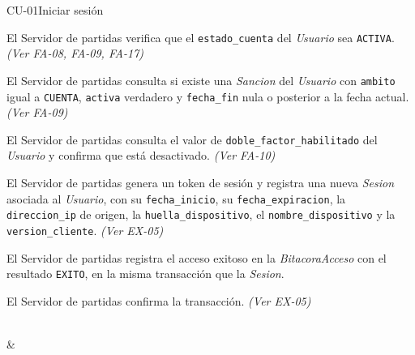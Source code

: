 \begin{fichacu}{CU-01}{Iniciar sesión}
{\begin{cuenum}[start=9]
      \item El Servidor de partidas verifica que el \texttt{estado\_\allowbreak{}cuenta} del \textit{Usuario} sea \texttt{ACTIVA}. \textit{(Ver \mbox{FA-08}, \mbox{FA-09}, \mbox{FA-17})}
      \item El Servidor de partidas consulta si existe una \textit{Sancion} del \textit{Usuario} con \texttt{ambito} igual a \texttt{CUENTA}, \texttt{activa} verdadero y \texttt{fecha\_\allowbreak{}fin} nula o posterior a la fecha actual. \textit{(Ver \mbox{FA-09})}
      \item El Servidor de partidas consulta el valor de \texttt{doble\_\allowbreak{}factor\_\allowbreak{}habilitado} del \textit{Usuario} y confirma que está desactivado. \textit{(Ver \mbox{FA-10})}
      \item El Servidor de partidas genera un token de sesión y registra una nueva \textit{Sesion} asociada al \textit{Usuario}, con su \texttt{fecha\_\allowbreak{}inicio}, su \texttt{fecha\_\allowbreak{}expiracion}, la \texttt{direccion\_\allowbreak{}ip} de origen, la \texttt{huella\_\allowbreak{}dispositivo}, el \texttt{nombre\_\allowbreak{}dispositivo} y la \texttt{version\_\allowbreak{}cliente}. \textit{(Ver \mbox{EX-05})}
      \item El Servidor de partidas registra el acceso exitoso en la \textit{BitacoraAcceso} con el resultado \texttt{EXITO}, en la misma transacción que la \textit{Sesion}.
      \item El Servidor de partidas confirma la transacción. \textit{(Ver \mbox{EX-05})}
    \end{cuenum}} \\
   &  \\ \hline

\end{fichacu}

